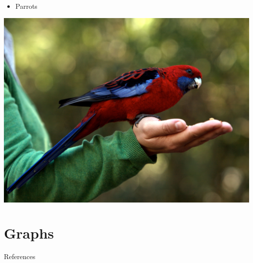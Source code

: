 \documentclass{beamer}					%
\begin{document}
\begin{frame}
\begin{itemize}
		\item Parrots
\end{itemize}
\includegraphics[scale=0.7]{parrots.png}

\end{frame}

\section{Graphs}






\begin{frame}[allowframebreaks]{References}
	
	
\end{frame}
\end{document}
